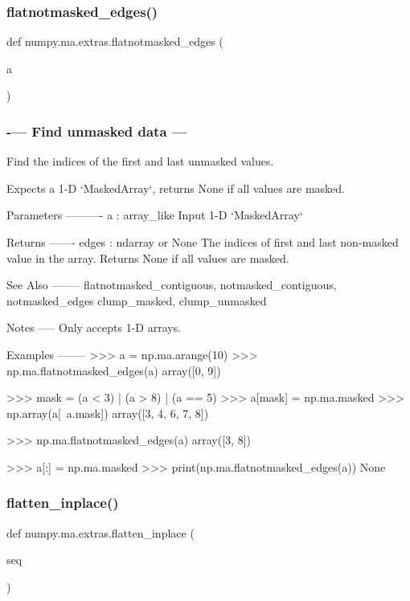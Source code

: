 \subsubsection{\texorpdfstring{flatnotmasked\+\_\+edges()}{flatnotmasked\_edges()}}
{\footnotesize\ttfamily def numpy.\+ma.\+extras.\+flatnotmasked\+\_\+edges (\begin{DoxyParamCaption}\item[{}]{a }\end{DoxyParamCaption})}





 \subsubsection*{-\/--- Find unmasked data --- }

\begin{DoxyVerb}Find the indices of the first and last unmasked values.

Expects a 1-D `MaskedArray`, returns None if all values are masked.

Parameters
----------
a : array_like
    Input 1-D `MaskedArray`

Returns
-------
edges : ndarray or None
    The indices of first and last non-masked value in the array.
    Returns None if all values are masked.

See Also
--------
flatnotmasked_contiguous, notmasked_contiguous, notmasked_edges
clump_masked, clump_unmasked

Notes
-----
Only accepts 1-D arrays.

Examples
--------
>>> a = np.ma.arange(10)
>>> np.ma.flatnotmasked_edges(a)
array([0, 9])

>>> mask = (a < 3) | (a > 8) | (a == 5)
>>> a[mask] = np.ma.masked
>>> np.array(a[~a.mask])
array([3, 4, 6, 7, 8])

>>> np.ma.flatnotmasked_edges(a)
array([3, 8])

>>> a[:] = np.ma.masked
>>> print(np.ma.flatnotmasked_edges(a))
None\end{DoxyVerb}
 \mbox{\label{namespacenumpy_1_1ma_1_1extras_ad204172520b08f4cc3ff746eef83eef8}} 
\subsubsection{\texorpdfstring{flatten\+\_\+inplace()}{flatten\_inplace()}}
{\footnotesize\ttfamily def numpy.\+ma.\+extras.\+flatten\+\_\+inplace (\begin{DoxyParamCaption}\item[{}]{seq }\end{DoxyParamCaption})}



